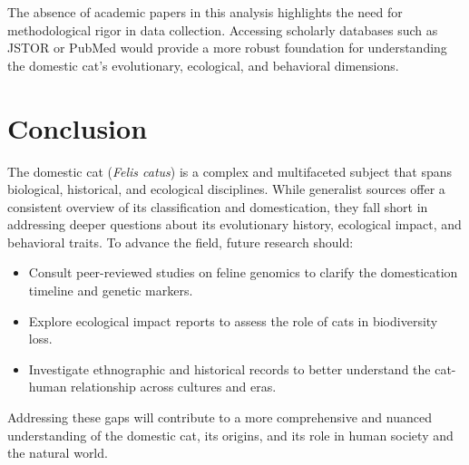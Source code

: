 \documentclass{article}
\begin{document}
The absence of academic papers in this analysis highlights the need for methodological rigor in data collection. Accessing scholarly databases such as JSTOR or PubMed would provide a more robust foundation for understanding the domestic cat's evolutionary, ecological, and behavioral dimensions.

\section{Conclusion}
The domestic cat (\textit{Felis catus}) is a complex and multifaceted subject that spans biological, historical, and ecological disciplines. While generalist sources offer a consistent overview of its classification and domestication, they fall short in addressing deeper questions about its evolutionary history, ecological impact, and behavioral traits. To advance the field, future research should:
\begin{itemize}
    \item Consult peer-reviewed studies on feline genomics to clarify the domestication timeline and genetic markers.
    \item Explore ecological impact reports to assess the role of cats in biodiversity loss.
    \item Investigate ethnographic and historical records to better understand the cat-human relationship across cultures and eras.
\end{itemize}

Addressing these gaps will contribute to a more comprehensive and nuanced understanding of the domestic cat, its origins, and its role in human society and the natural world.

\printbibliography
\end{document}
